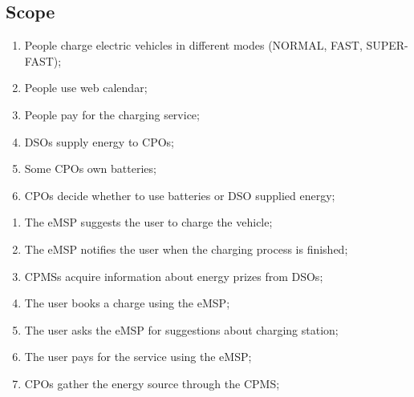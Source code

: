 \subsection{Scope}

\begin{enumerate}[label=\textbf{W\arabic*}]
    \item People charge electric vehicles in different modes (NORMAL, FAST, SUPER-FAST); \label{world:people-charge-vehicles}
    \item People use web calendar; \label{world:people-use-calendars}
    \item People pay for the charging service; \label{world:people-pay-service}
    \item \acp{DSO} supply energy to \acp{CPO}; \label{world:DSO-supply-energy}
    \item Some \acp{CPO} own batteries; \label{world:CPO-own-batteries}
    \item \acp{CPO} decide whether to use batteries or \ac{DSO} supplied energy; \label{world:CPO-decide-energy}
\end{enumerate}
\begin{enumerate}[label=\textbf{S\arabic*}]
    \item The \ac{eMSP} suggests the user to charge the vehicle; \label{shared:eMSP-suggests-charge}
    \item The \ac{eMSP} notifies the user when the charging process is finished; \label{shared:eMSP-notifies-charging-finished}
    \item \acp{CPMS} acquire information about energy prizes from \acp{DSO}; \label{shared:CPMS-info-from-DSO}
    \item The user books a charge using the \ac{eMSP}; \label{shared:user-books-charge}
    \item The user asks the \ac{eMSP} for suggestions about charging station; \label{shared:user-asks-suggestions}
    \item The user pays for the service using the \ac{eMSP}; \label{shared:user-pays-service}
    \item \acp{CPO} gather the energy source through the \ac{CPMS}; \label{shared:CPO-energy-through-CPMS}
\end{enumerate}


